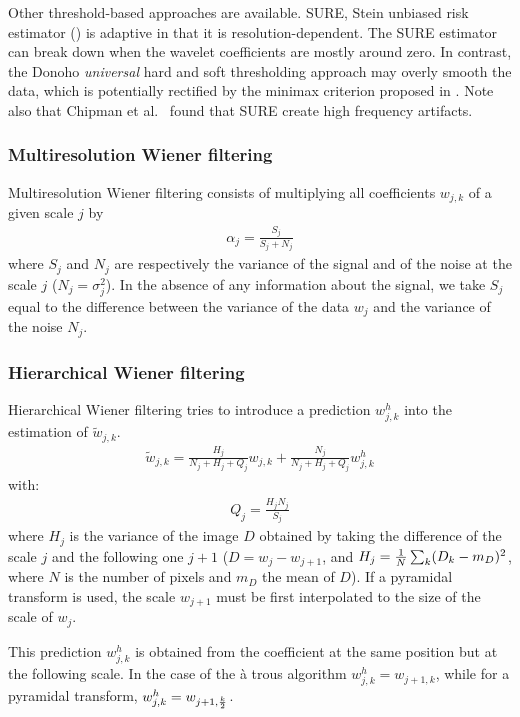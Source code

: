 Other threshold-based approaches are available. SURE, 
Stein unbiased risk estimator (\cite{rest:donoho95}) 
is adaptive in that it is resolution-dependent. The SURE estimator can 
break down when the wavelet coefficients are mostly around zero.
In contrast, the Donoho {\em universal} hard and soft thresholding approach 
may overly smooth the data, which is potentially rectified by the minimax
criterion proposed in \cite{rest:donoho93_1}. Note also that 
Chipman et al.\ \cite{wave:chipman97}
found that SURE create high frequency artifacts.

\subsubsection*{Multiresolution Wiener filtering}
Multiresolution Wiener filtering \cite{starck:sta94_4} consists of 
multiplying all
coefficients $w_{j,k}$ of a given scale $j$ by 
\begin{eqnarray}
\alpha_j = \frac{S_j}{S_j + N_j}
\end{eqnarray}
where $S_j$ and $N_j$ are respectively the variance of the signal 
and of the noise at the scale $j$ ($N_j = \sigma_j^2$). In the absence
of any information about the signal, we take $S_j$ equal to 
the difference between the variance of the data $w_j$ and the variance 
of the noise $N_j$.

\subsubsection*{Hierarchical Wiener filtering}
Hierarchical Wiener filtering \cite{starck:sta94_4} tries to 
introduce a prediction $w_{j,k}^h$ into the estimation of $\tilde w_{j,k}$. 
\begin{eqnarray}
\tilde w_{j,k} = \frac{H_j}{N_j+H_j+Q_j} w_{j,k} + \frac{N_j}{N_j+H_j+Q_j} w_{j,k}^h
\end{eqnarray}
with:
\begin{eqnarray}
Q_j = \frac{H_jN_j}{S_j}
\end{eqnarray}
where $H_j$ is the variance of the image $D$ obtained by taking the difference
of the scale $j$ and the following one $j+1$ ($D = w_j - w_{j+1}$, and
$H_j = {1 \over N} \sum_k (D_k - m_D)^2$, where $N$ is the number of pixels and
$m_D$ the mean of $D$). If a pyramidal transform is used, the scale
$w_{j+1}$ must be first interpolated to the size of the scale of $w_j$.

This prediction $w_{j,k}^h$ is obtained from 
the coefficient at the same position but at the following scale.
In the case of the \`a trous algorithm $w_{j,k}^h = w_{j+1,k}$, while for
a pyramidal transform, $w_{j,k}^h = w_{j+1,{k \over 2}}$. 


